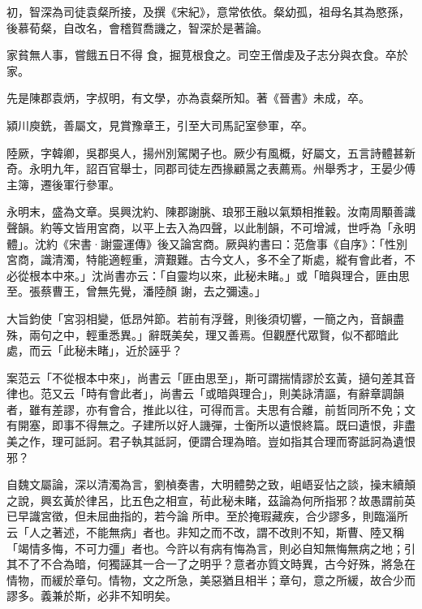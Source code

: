 \begin{pinyinscope}
 初，智深為司徒袁粲所接，及撰《宋紀》，意常依依。粲幼孤，祖母名其為愍孫，後慕荀粲，自改名，會稽賀喬譏之，智深於是著論。



 家貧無人事，嘗餓五日不得
 食，掘莧根食之。司空王僧虔及子志分與衣食。卒於家。



 先是陳郡袁炳，字叔明，有文學，亦為袁粲所知。著《晉書》未成，卒。



 潁川庾銑，善屬文，見賞豫章王，引至大司馬記室參軍，卒。



 陸厥，字韓卿，吳郡吳人，揚州別駕閑子也。厥少有風概，好屬文，五言詩體甚新奇。永明九年，詔百官舉士，同郡司徒左西掾顧暠之表薦焉。州舉秀才，王晏少傅主簿，遷後軍行參軍。



 永明末，盛為文章。吳興沈約、陳郡謝朓、琅邪王融以氣類相推轂。汝南周顒善識聲韻。約等文皆用宮商，以平上去入為四聲，以此制韻，不可增減，世呼為「永明體」。沈約《宋書·謝靈運傳》後又論宮商。厥與約書曰：范詹事《自序》：「性別宮商，識清濁，特能適輕重，濟艱難。古今文人，多不全了斯處，縱有會此者，不必從根本中來。」沈尚書亦云：「自靈均以來，此秘未睹。」或「暗與理合，匪由思至。張蔡曹王，曾無先覺，潘陸顏
 謝，去之彌遠。」



 大旨鈞使「宮羽相變，低昂舛節。若前有浮聲，則後須切響，一簡之內，音韻盡殊，兩句之中，輕重悉異。」辭既美矣，理又善焉。但觀歷代眾賢，似不都暗此處，而云「此秘未睹」，近於誣乎？



 案范云「不從根本中來」，尚書云「匪由思至」，斯可謂揣情謬於玄黃，擿句差其音律也。范又云「時有會此者」，尚書云「或暗與理合」，則美詠清謳，有辭章調韻者，雖有差謬，亦有會合，推此以往，可得而言。夫思有合離，前哲同所不免；文有開塞，即事不得無之。子建所以好人譏彈，士衡所以遺恨終篇。既曰遺恨，非盡美之作，理可詆訶。君子執其詆訶，便謂合理為暗。豈如指其合理而寄詆訶為遺恨邪？



 自魏文屬論，深以清濁為言，劉楨奏書，大明體勢之致，岨峿妥怗之談，操末續顛之說，興玄黃於律呂，比五色之相宣，茍此秘未睹，茲論為何所指邪？故愚謂前英已早識宮徵，但未屈曲指的，若今論
 所申。至於掩瑕藏疾，合少謬多，則臨淄所云「人之著述，不能無病」者也。非知之而不改，謂不改則不知，斯曹、陸又稱「竭情多悔，不可力彊」者也。今許以有病有悔為言，則必自知無悔無病之地；引其不了不合為暗，何獨誣其一合一了之明乎？意者亦質文時異，古今好殊，將急在情物，而緩於章句。情物，文之所急，美惡猶且相半；章句，意之所緩，故合少而謬多。義兼於斯，必非不知明矣。




\end{pinyinscope}

